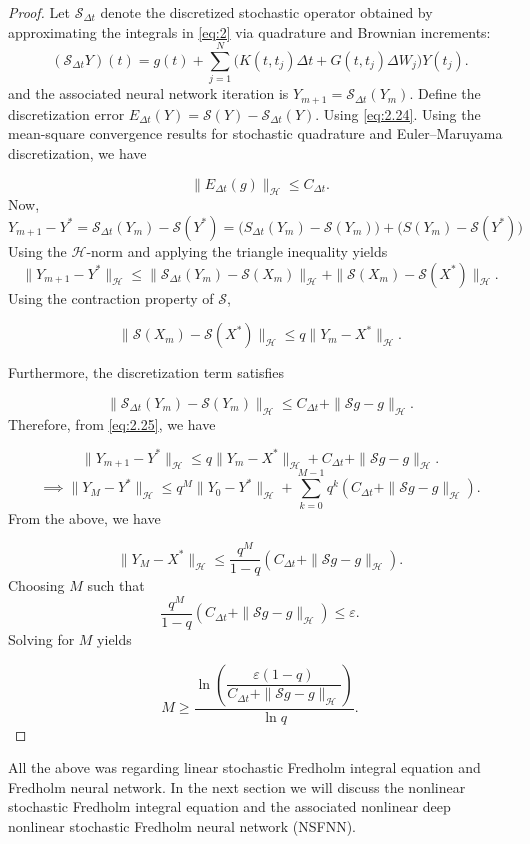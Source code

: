 \documentclass[preprint,12pt,authoryear]{elsarticle}
\begin{document}
\begin{proof}
Let $\mathcal S_{\Delta t}$ denote the discretized stochastic operator 
obtained by approximating the integrals in \eqref{eq:2} via quadrature and 
Brownian increments:
\begin{equation}
(\mathcal S_{\Delta t}Y)(t)
=
g(t)
+
\sum_{j=1}^{N}
\Big(
K(t,t_j)\Delta t
+
G(t,t_j)\Delta W_j
\Big)Y(t_j).
\label{eq:2.24}
\end{equation}
and the associated neural network iteration is
$Y_{m+1}=\mathcal S_{\Delta t}(Y_m).$ Define the discretization error
$E_{\Delta t}(Y)
=\mathcal S(Y)-\mathcal S_{\Delta t}(Y).$
Using \eqref{eq:2.24}. Using the mean-square convergence results for stochastic quadrature and Euler–Maruyama discretization, we have

\[
\|E_{\Delta t}(g)\|_{\mathcal H}
\le
C_{\Delta t}.
\]
Now, \[
Y_{m+1}-Y^\ast
=
\mathcal S_{\Delta t}(Y_m)-\mathcal S(Y^\ast)=\big(S_{\Delta t}(Y_m)-\mathcal S(Y_m)\big)+\big(S(Y_m)-\mathcal S(Y^\ast)\big)
\]
Using the $\mathcal H$-norm and applying the triangle inequality yields
\begin{equation}
    \|Y_{m+1}-Y^\ast\|_{\mathcal H}
\le
\|\mathcal S_{\Delta t}(Y_m)-\mathcal S(X_m)\|_{\mathcal H}
+
\|\mathcal S(X_m)-\mathcal S(X^\ast)\|_{\mathcal H}.
\label{eq:2.25}
\end{equation}
Using the contraction property of $\mathcal S$,

\[
\|\mathcal S(X_m)-\mathcal S(X^\ast)\|_{\mathcal H}
\le
q\|Y_m-X^\ast\|_{\mathcal H}.
\]

Furthermore, the discretization term satisfies

\[
\|\mathcal S_{\Delta t}(Y_m)-\mathcal S(Y_m)\|_{\mathcal H}
\le
C_{\Delta t}+\|\mathcal S g-g\|_{\mathcal H}.
\]
Therefore, from \eqref{eq:2.25}, we have 

\[
\|Y_{m+1}-Y^\ast\|_{\mathcal H}
\le
q\|Y_m-X^\ast\|_{\mathcal H}
+
C_{\Delta t}
+
\|\mathcal S g-g\|_{\mathcal H}.
\]
\[
\implies\|Y_M-Y^\ast\|_{\mathcal H}
\le
q^M\|Y_0-Y^\ast\|_{\mathcal H}
+
\sum_{k=0}^{M-1} q^k
\left(
C_{\Delta t}
+
\|\mathcal S g-g\|_{\mathcal H}
\right).
\]
From the above, we have

\[
\|Y_M-X^\ast\|_{\mathcal H}
\le
\frac{q^M}{1-q}
\left(
C_{\Delta t}
+
\|\mathcal S g-g\|_{\mathcal H}
\right).
\]
Choosing  $M$ such that
\[
\frac{q^M}{1-q}
\left(
C_{\Delta t}
+
\|\mathcal S g-g\|_{\mathcal H}
\right)
\le
\varepsilon.
\]
Solving for $M$ yields

\[
M
\ge
\frac{
\ln\!\left(
\dfrac{\varepsilon(1-q)}
{C_{\Delta t}+\|\mathcal S g-g\|_{\mathcal H}}
\right)
}{\ln q}.
\]
\end{proof}
All the above was regarding linear stochastic Fredholm integral equation and Fredholm neural network. In the next section we will discuss the nonlinear stochastic Fredholm integral equation and the associated nonlinear deep nonlinear stochastic Fredholm neural network (NSFNN). 
\end{document}
